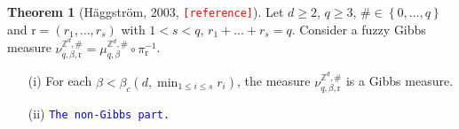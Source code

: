 \documentclass[12pt]{article}
\renewcommand{\r}{\mathrm{r}}
\newcommand{\Z}{\mathbb{Z}}
\newcommand{\set}[1]{\left\{#1\right\}}
\newcommand{\1}{\mathbbm{1}}
\newcommand{\5}{\vspace{0.5cm}}
\theoremstyle{definition}
\newtheorem{thm}{Theorem}[section]
\begin{document}
\begin{thm}[H\"aggstr\"om, 2003, \textcolor{red}{\texttt{[reference]}}]
Let $d\geq 2$, $q\geq 3$, $\#\in\set{0,\ldots,q}$ and $\r=(r_1,\ldots,r_s)$ with $1<s<q$, $r_1+\ldots+r_s=q$. Consider a fuzzy Gibbs measure $\nu_{q,\beta,\r}^{\Z^d,\#}=\mu_{q,\beta}^{\Z^d,\#}\circ\pi_{\r}^{-1}$.
\begin{itemize}
	\item[(i)] For each $\beta<\beta_c(d,\min_{1\leq i\leq s}r_i)$, the measure $\nu_{q,\beta,\r}^{\Z^d,\#}$ is a Gibbs measure.
	\item[(ii)] \textcolor{blue}{\texttt{The non-Gibbs part.}}
\end{itemize}
\end{thm}

\end{document}
